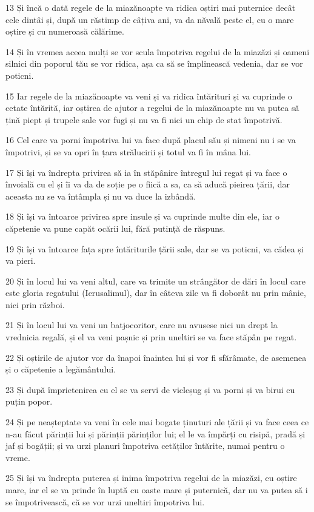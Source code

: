 \par 13 Și încă o dată regele de la miazănoapte va ridica oștiri mai puternice decât cele dintâi și, după un răstimp de câțiva ani, va da năvală peste el, cu o mare oștire și cu numeroasă călărime.
\par 14 Și în vremea aceea mulți se vor scula împotriva regelui de la miazăzi și oameni silnici din poporul tău se vor ridica, așa ca să se împlinească vedenia, dar se vor poticni.
\par 15 Iar regele de la miazănoapte va veni și va ridica întărituri și va cuprinde o cetate întărită, iar oștirea de ajutor a regelui de la miazănoapte nu va putea să țină piept și trupele sale vor fugi și nu va fi nici un chip de stat împotrivă.
\par 16 Cel care va porni împotriva lui va face după placul său și nimeni nu i se va împotrivi, și se va opri în țara strălucirii și totul va fi în mâna lui.
\par 17 Și își va îndrepta privirea să ia în stăpânire întregul lui regat și va face o învoială cu el și îi va da de soție pe o fiică a sa, ca să aducă pieirea țării, dar aceasta nu se va întâmpla și nu va duce la izbândă.
\par 18 Și își va întoarce privirea spre insule și va cuprinde multe din ele, iar o căpetenie va pune capăt ocării lui, fără putință de răspuns.
\par 19 Și își va întoarce fața spre întăriturile țării sale, dar se va poticni, va cădea și va pieri.
\par 20 Și în locul lui va veni altul, care va trimite un strângător de dări în locul care este gloria regatului (Ierusalimul), dar în câteva zile va fi doborât nu prin mânie, nici prin război.
\par 21 Și în locul lui va veni un batjocoritor, care nu avusese nici un drept la vrednicia regală, și el va veni pașnic și prin uneltiri se va face stăpân pe regat.
\par 22 Și oștirile de ajutor vor da înapoi înaintea lui și vor fi sfărâmate, de asemenea și o căpetenie a legământului.
\par 23 Și după împrietenirea cu el se va servi de vicleșug și va porni și va birui cu puțin popor.
\par 24 Și pe neașteptate va veni în cele mai bogate ținuturi ale țării și va face ceea ce n-au făcut părinții lui și părinții părinților lui; el le va împărți cu risipă, pradă și jaf și bogății; și va urzi planuri împotriva cetăților întărite, numai pentru o vreme.
\par 25 Și își va îndrepta puterea și inima împotriva regelui de la miazăzi, eu oștire mare, iar el se va prinde în luptă cu oaste mare și puternică, dar nu va putea să i se împotrivească, că se vor urzi uneltiri împotriva lui.
